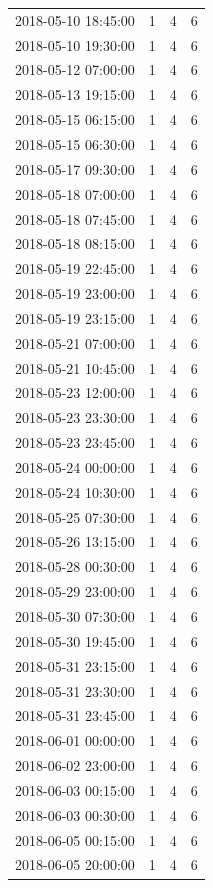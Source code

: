 \begin{tabular}{lrrr}
2018-05-10 18:45:00 & 1 & 4 & 6 \\
2018-05-10 19:30:00 & 1 & 4 & 6 \\
2018-05-12 07:00:00 & 1 & 4 & 6 \\
2018-05-13 19:15:00 & 1 & 4 & 6 \\
2018-05-15 06:15:00 & 1 & 4 & 6 \\
2018-05-15 06:30:00 & 1 & 4 & 6 \\
2018-05-17 09:30:00 & 1 & 4 & 6 \\
2018-05-18 07:00:00 & 1 & 4 & 6 \\
2018-05-18 07:45:00 & 1 & 4 & 6 \\
2018-05-18 08:15:00 & 1 & 4 & 6 \\
2018-05-19 22:45:00 & 1 & 4 & 6 \\
2018-05-19 23:00:00 & 1 & 4 & 6 \\
2018-05-19 23:15:00 & 1 & 4 & 6 \\
2018-05-21 07:00:00 & 1 & 4 & 6 \\
2018-05-21 10:45:00 & 1 & 4 & 6 \\
2018-05-23 12:00:00 & 1 & 4 & 6 \\
2018-05-23 23:30:00 & 1 & 4 & 6 \\
2018-05-23 23:45:00 & 1 & 4 & 6 \\
2018-05-24 00:00:00 & 1 & 4 & 6 \\
2018-05-24 10:30:00 & 1 & 4 & 6 \\
2018-05-25 07:30:00 & 1 & 4 & 6 \\
2018-05-26 13:15:00 & 1 & 4 & 6 \\
2018-05-28 00:30:00 & 1 & 4 & 6 \\
2018-05-29 23:00:00 & 1 & 4 & 6 \\
2018-05-30 07:30:00 & 1 & 4 & 6 \\
2018-05-30 19:45:00 & 1 & 4 & 6 \\
2018-05-31 23:15:00 & 1 & 4 & 6 \\
2018-05-31 23:30:00 & 1 & 4 & 6 \\
2018-05-31 23:45:00 & 1 & 4 & 6 \\
2018-06-01 00:00:00 & 1 & 4 & 6 \\
2018-06-02 23:00:00 & 1 & 4 & 6 \\
2018-06-03 00:15:00 & 1 & 4 & 6 \\
2018-06-03 00:30:00 & 1 & 4 & 6 \\
2018-06-05 00:15:00 & 1 & 4 & 6 \\
2018-06-05 20:00:00 & 1 & 4 & 6 \\

\end{tabular}
